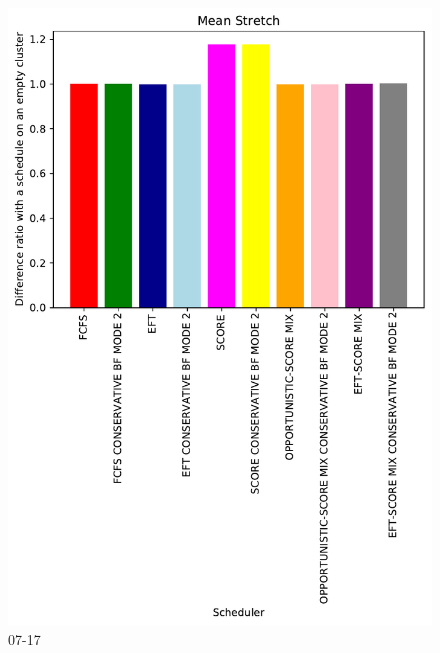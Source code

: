 \documentclass[a4paper]{article}
\begin{document}
\begin{figure}\includegraphics[width=0.9\linewidth]{MBSS/plot/Results_FCFS_Score_Backfill_2022-07-17->2022-07-17_V10000_Mean_Stretch_450_128_32_256_4_1024.pdf}\caption{07-17}\end{figure}
\end{document}
